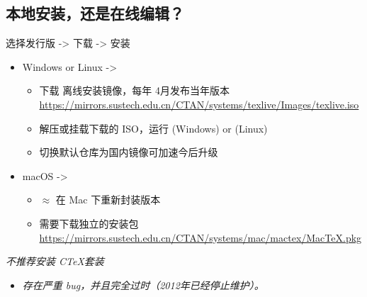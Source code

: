 \subsection{本地安装，还是在线编辑？}

\begin{frame}[fragile]{选择发行版 -> 下载 -> 安装}
  \begin{itemize}
    \item Windows or Linux -> \texlive
      \begin{itemize}
        \item 下载 \texlive 离线安装镜像，每年 4月发布当年版本 \url{https://mirrors.sustech.edu.cn/CTAN/systems/texlive/Images/texlive.iso}
        \item 解压或挂载下载的 ISO，运行  (Windows) or  (Linux)
        \item 切换默认仓库为国内镜像可加速今后升级
      \end{itemize}
    \item macOS -> \mactex
      \begin{itemize}
        \item $\approx$ \texlive 在 Mac 下重新封装版本
        \item 需要下载独立的安装包 \url{https://mirrors.sustech.edu.cn/CTAN/systems/mac/mactex/MacTeX.pkg}
      \end{itemize}
\end{itemize}
    \emph{不推荐安装 C\TeX 套装}
    \begin{itemize}
        \item \emph{存在严重 bug，并且完全过时（2012年已经停止维护）。}
    \end{itemize}
\end{frame}


